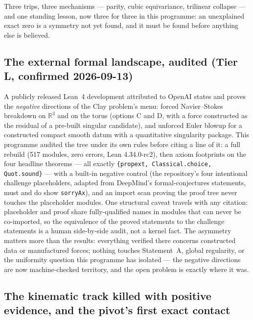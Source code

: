 \documentclass[11pt,a4paper]{article}
\theoremstyle{definition}
\theoremstyle{plain}
\begin{document}
Three trips, three mechanisms --- parity, cubic equivariance, trilinear collapse --- and one
standing lesson, now three for three in this programme: an unexplained exact zero is a symmetry
not yet found, and it must be found before anything else is believed.

\subsection{The external formal landscape, audited (Tier L, confirmed 2026-09-13)}
\label{sec:externalaudit}

A publicly released Lean~4 development attributed to OpenAI states and proves the \emph{negative}
directions of the Clay problem's menu: forced Navier--Stokes breakdown on $\mathbb{R}^3$ and on
the torus (options C and D, with a force constructed as the residual of a pre-built singular
candidate), and unforced Euler blowup for a constructed compact smooth datum with a quantitative
singularity package. This programme audited the tree under its own rules before citing a line of
it: a full rebuild (517 modules, zero errors, Lean 4.34.0-rc2), then axiom footprints on the four
headline theorems --- all exactly \texttt{\{propext, Classical.choice, Quot.sound\}} --- with a
built-in negative control (the repository's four intentional challenge placeholders, adapted from
DeepMind's formal-conjectures statements, must and do show \texttt{sorryAx}), and an import scan
proving the proof tree never touches the placeholder modules. One structural caveat travels with
any citation: placeholder and proof share fully-qualified names in modules that can never be
co-imported, so the equivalence of the proved statements to the challenge statements is a human
side-by-side audit, not a kernel fact. The asymmetry matters more than the results: everything
verified there concerns constructed data or manufactured forces; nothing touches Statement~A,
global regularity, or the uniformity question this programme has isolated --- the negative
directions are now machine-checked territory, and the open problem is exactly where it was.

\subsection{The kinematic track killed with positive evidence, and the pivot's first exact contact}
\label{sec:pivot}
\end{document}

